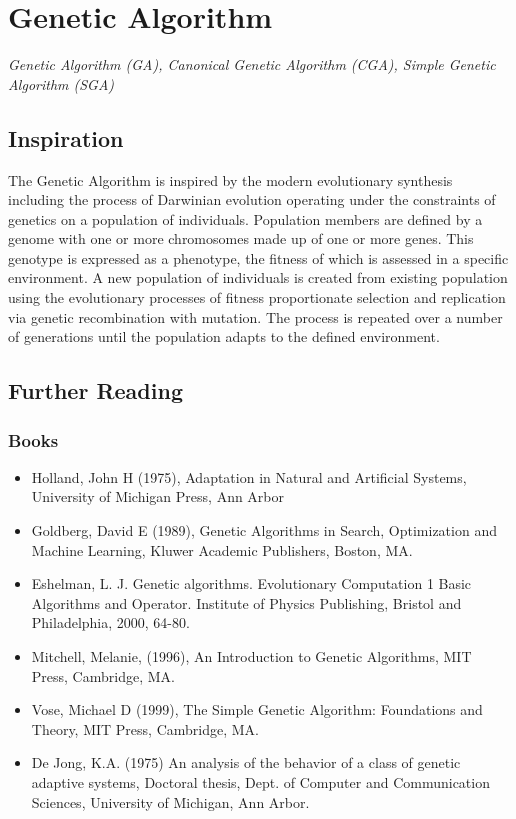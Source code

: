 \section{Genetic Algorithm}
\emph{Genetic Algorithm (GA), Canonical Genetic Algorithm (CGA), Simple Genetic Algorithm (SGA)}

\subsection{Inspiration}
The Genetic Algorithm is inspired by the modern evolutionary synthesis including the process of Darwinian evolution operating under the constraints of genetics on a population of individuals. Population members are defined by a genome with one or more chromosomes made up of one or more genes. This genotype is expressed as a phenotype, the fitness of which is assessed in a specific environment. A new population of individuals is created from existing population using the evolutionary processes of fitness proportionate selection and replication via genetic recombination with mutation. The process is repeated over a number of generations until the population adapts to the defined environment.

\subsection{Further Reading}

\subsubsection{Books}

\begin{itemize}
	\item Holland, John H (1975), Adaptation in Natural and Artificial Systems, University of Michigan Press, Ann Arbor
	\item Goldberg, David E (1989), Genetic Algorithms in Search, Optimization and Machine Learning, Kluwer Academic Publishers, Boston, MA.
	\item Eshelman, L. J. Genetic algorithms. Evolutionary Computation 1 Basic Algorithms and Operator. Institute of Physics Publishing, Bristol and Philadelphia, 2000, 64-80.
	\item Mitchell, Melanie, (1996), An Introduction to Genetic Algorithms, MIT Press, Cambridge, MA.
	\item Vose, Michael D (1999), The Simple Genetic Algorithm: Foundations and Theory, MIT Press, Cambridge, MA.
	\item De Jong, K.A. (1975) An analysis of the behavior of a class of genetic adaptive systems, Doctoral thesis, Dept. of Computer and Communication Sciences, University of Michigan, Ann Arbor.
\end{itemize}


